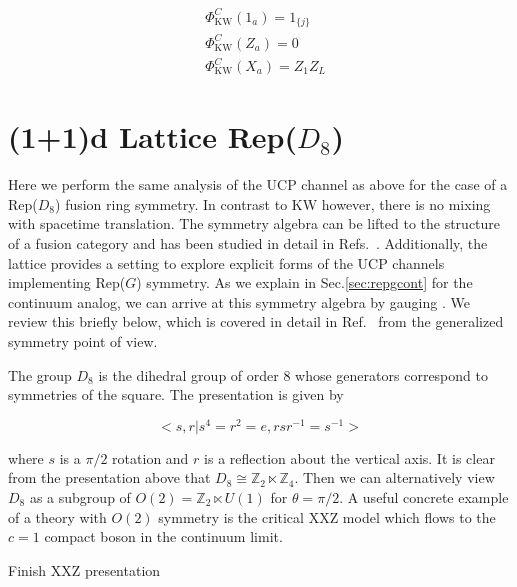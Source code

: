 \documentclass{article}
\theoremstyle{definition}
\begin{document}
\begin{eqnarray}
&\Phi^C_{\text{KW}}(1_a) = 1_{\{j\}}\\
&\Phi^C_{\text{KW}}(Z_a) = 0\\
&\Phi^C_{\text{KW}}(X_a) = Z_1Z_L
\end{eqnarray}









\section{(1+1)d Lattice Rep($D_8$)}

Here we perform the same analysis of the UCP channel as above for the case of a Rep($D_8$) fusion ring symmetry.  In contrast to KW however, there is no mixing with spacetime translation.  The symmetry algebra can be lifted to the structure of a fusion category and has been studied in detail in Refs.~\cite{shao2025additivityhaagdualitynoninvertible, seifnashri2025gaugingnisonthelattice}.  Additionally, the lattice provides a setting to explore explicit forms of the UCP channels implementing Rep($G$) symmetry.  As we explain in Sec.\ref{sec:repgcont} for the continuum analog, we can arrive at this symmetry algebra by gauging .  We review this briefly below, which is covered in detail in Ref.~\cite{seifnashri2025gaugingnisonthelattice} from the generalized symmetry point of view.

\color{brown}



\color{black}


The group $D_8$ is the dihedral group of order 8 whose generators correspond to symmetries of the square.  The presentation is given by

\begin{equation}
    <s,r|s^4 = r^2 = e, rsr^{-1} = s^{-1}>
\end{equation}

where $s$ is a $\pi/2$ rotation and $r$ is a reflection about the vertical axis.  It is clear from the presentation above that $D_8 \cong \mathbb{Z}_2 \ltimes \mathbb{Z}_4$.  Then we can alternatively view $D_8$ as a subgroup of $O(2) = \mathbb{Z}_2 \ltimes U(1)$ for $\theta = \pi/2$.  A useful concrete example of a theory with $O(2)$ symmetry is the critical XXZ model which flows to the $c=1$ compact boson in the continuum limit.

\color{brown}
Finish XXZ presentation
\end{document}
